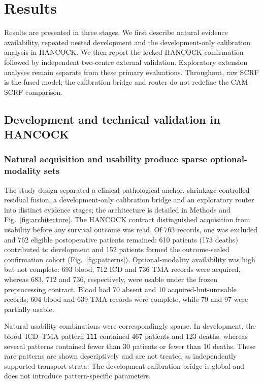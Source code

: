 \documentclass[pdflatex,sn-nature]{sn-jnl}
\begin{document}
\section{Results}

Results are presented in three stages. We first describe natural evidence availability, repeated nested development and the development-only calibration analysis in HANCOCK. We then report the locked HANCOCK confirmation followed by independent two-centre external validation. Exploratory extension analyses remain separate from these primary evaluations. Throughout, raw SCRF is the fused model; the calibration bridge and router do not redefine the CAM--SCRF comparison.

\subsection{Development and technical validation in HANCOCK}

\subsubsection*{Natural acquisition and usability produce sparse optional-modality sets}

The study design separated a clinical-pathological anchor, shrinkage-controlled residual fusion, a development-only calibration bridge and an exploratory router into distinct evidence stages; the architecture is detailed in Methods and Fig.~\ref{fig:architecture}. The HANCOCK contract distinguished acquisition from usability before any survival outcome was read. Of 763 records, one was excluded and 762 eligible postoperative patients remained: 610 patients (173 deaths) contributed to development and 152 patients formed the outcome-sealed confirmation cohort (Fig.~\ref{fig:patterns}). Optional-modality availability was high but not complete: 693 blood, 712 ICD and 736 TMA records were acquired, whereas 683, 712 and 736, respectively, were usable under the frozen preprocessing contract. Blood had 70 absent and 10 acquired-but-unusable records; 604 blood and 639 TMA records were complete, while 79 and 97 were partially usable.

Natural usability combinations were correspondingly sparse. In development, the blood--ICD--TMA pattern \texttt{111} contained 467 patients and 123 deaths, whereas several patterns contained fewer than 30 patients or fewer than 10 deaths. These rare patterns are shown descriptively and are not treated as independently supported transport strata. The development calibration bridge is global and does not introduce pattern-specific parameters.
\end{document}
